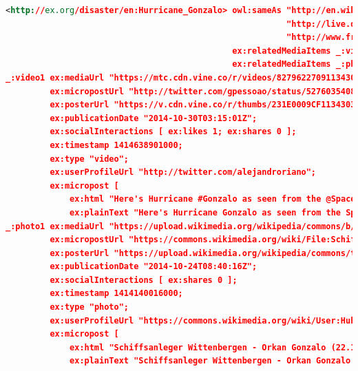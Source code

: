 \documentclass[letterpaper]{article}
\begin{document}
\begin{lstlisting}[caption={Exemplary Linked Data for \emph{Hurricane Gonzalo} using a~yet to-be-defined vocabulary
  that interlinks the disaster with several other Linked Data sources and relates it to
  multimedia content on online social networking sites},
  label=listing:linkeddata,language=xml,float=*t, stringstyle=\color{gray}]
<http://ex.org/disaster/en:Hurricane_Gonzalo> owl:sameAs "http://en.wikipedia.org/wiki/Hurricane_Gonzalo",
                                                         "http://live.dbpedia.org/page/Hurricane_Gonzalo",
                                                         "http://www.freebase.com/m/0123kcg5";
                                              ex:relatedMediaItems _:video1;
                                              ex:relatedMediaItems _:photo1;
_:video1 ex:mediaUrl "https://mtc.cdn.vine.co/r/videos/82796227091134303173323251712_2ca88ba5444.5.1.16698738182474199804.mp4";
         ex:micropostUrl "http://twitter.com/gpessoao/status/527603540860997632";
         ex:posterUrl "https://v.cdn.vine.co/r/thumbs/231E0009CF1134303174572797952_2.5.1.16698738182474199804.mp4.jpg";
         ex:publicationDate "2014-10-30T03:15:01Z";
         ex:socialInteractions [ ex:likes 1; ex:shares 0 ];
         ex:timestamp 1414638901000;
         ex:type "video";
         ex:userProfileUrl "http://twitter.com/alejandroriano";
         ex:micropost [
             ex:html "Here's Hurricane #Gonzalo as seen from the @Space_Station as it orbited above today https://t.co/RpJt0P2bXa";
             ex:plainText "Here's Hurricane Gonzalo as seen from the Space_Station as it orbited above today" ].
_:photo1 ex:mediaUrl "https://upload.wikimedia.org/wikipedia/commons/b/bb/Schiffsanleger_Wittenbergen_-_Orkan_Gonzalo.jpg";
         ex:micropostUrl "https://commons.wikimedia.org/wiki/File:Schiffsanleger_Wittenbergen_-_Orkan_Gonzalo_(22.10.2014)_01.jpg";
         ex:posterUrl "https://upload.wikimedia.org/wikipedia/commons/thumb/b/bb/Schiffsanleger_Wittenbergen_-_Orkan_Gonzalo_%2822.10.2014%29_01.jpg/500px-Schiffsanleger_Wittenbergen_-_Orkan_Gonzalo_(22.10.2014)_01.jpg" .
         ex:publicationDate "2014-10-24T08:40:16Z";
         ex:socialInteractions [ ex:shares 0 ];
         ex:timestamp 1414140016000;
         ex:type "photo";
         ex:userProfileUrl "https://commons.wikimedia.org/wiki/User:Huhu Uet";
         ex:micropost [
             ex:html "Schiffsanleger Wittenbergen - Orkan Gonzalo (22.10.2014) 01";
             ex:plainText "Schiffsanleger Wittenbergen - Orkan Gonzalo (22.10.2014) 01" ].
\end{lstlisting}
\end{document}
